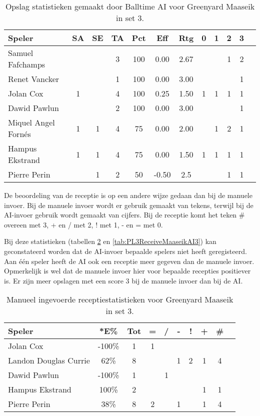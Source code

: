 \begin{table}[ht!]
  \centering
  \scriptsize
  \begin{tabular}{|l|c|c|c|c|c|c|c|c|c|c|c|} \hline
    \textbf{Speler} & SA & SE & TA & Pct & Eff & Rtg & 0 & 1 & 2 & 3 \\ \hline
    Samuel Fafchamps &  &  & 3 & 100 & 0.00 & 2.67 &   &  & 1 & 2  \\
    Renet Vancker &  &  & 1 & 100 & 0.00 & 3.00 &  &  &  & 1 \\
    Jolan Cox & 1 &  & 4 & 100 & 0.25 & 1.50 & 1 & 1 & 1 & 1 \\
    Dawid Pawlun &  &  & 2 & 100 & 0.00 & 3.00 &   &   & & 1 \\
    Miquel Angel Fornés & 1 & 1 & 4 & 75 & 0.00 & 2.00 &   & 1 & 2 & 1 \\
    Hampus Ekstrand & 1 & 1 & 4 & 75 & 0.00 & 1.50 & 1 & 1 & 1 & 1\\
    Pierre Perin & & 1 & 2 & 50 & -0.50 & 2.5 &   &  & 1 & 1 \\ \hline
  \end{tabular}
  \caption[Opslagstatistieken gemaakt door Balltime AI voor Greenyard Maaseik in set 3]{\label{tab:PL3ServeMaaseikAI3}Opslag statistieken gemaakt door Balltime AI voor Greenyard Maaseik in set 3.}
\end{table}

De beoordeling van de receptie is op een andere wijze gedaan dan bij de manuele invoer. Bij de manuele invoer wordt er gebruik gemaakt van tekens, terwijl bij de AI-invoer gebruik wordt gemaakt van cijfers. Bij de receptie komt het teken \# overeen met 3, + en / met 2, ! met 1, - en = met 0.

Bij deze statistieken (tabellen \ref{tab:PL3ReceiveMaaseikMan3} en \ref{tab:PL3ReceiveMaaseikAI3}) kan geconstateerd worden dat de AI-invoer bepaalde spelers niet heeft geregisteerd. Aan één speler heeft de AI ook een receptie meer gegeven dan de manuele invoer. Opmerkelijk is wel dat de manuele invoer hier voor bepaalde recepties positiever is. Er zijn meer opslagen met een score 3 bij de manuele invoer dan bij de AI.

\begin{table}[ht!]
    \centering
    \scriptsize
    \begin{tabular}{|l|c|c|c|c|c|c|c|c|c|} \hline
        \textbf{Speler} & *E\% & Tot & = & / & - & ! & + & \#\\ \hline
        Jolan Cox & -100\% & 1 & 1 &  &  &  &  & \\ 
        Landon Douglas Currie & 62\% & 8 &  &  & 1 & 2 & 1 & 4 \\ 
        Dawid Pawlun & -100\% & 1 &  & 1 &  &  &  &  \\ 
        Hampus Ekstrand & 100\% & 2 &  &  &  &  & 1 & 1 \\ 
        Pierre Perin & 38\% & 8 & 2 &  & 1 &  & 1 & 4 \\ \hline
    \end{tabular}
    \caption[Manueel ingevoerde receptiestatistieken voor Greenyard Maaseik in set 3]{\label{tab:PL3ReceiveMaaseikMan3}Manueel ingevoerde receptiestatistieken voor Greenyard Maaseik in set 3.}
\end{table}

